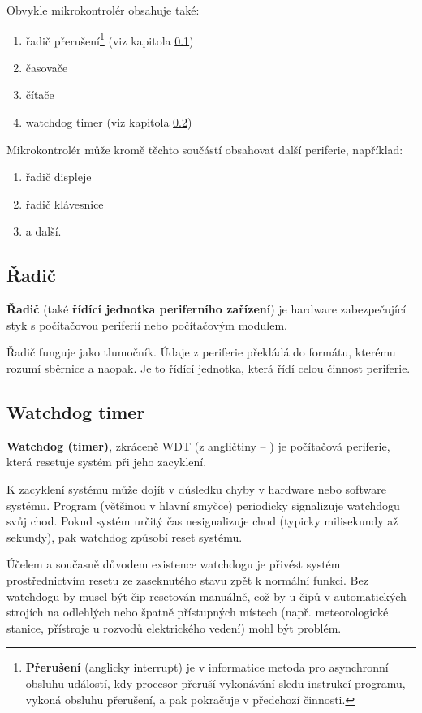 \documentclass[12pt]{article}
\begin{document}
Obvykle mikrokontrolér obsahuje také:
\begin{enumerate}
	\item řadič přerušení\footnote{\textbf{Přerušení} (anglicky interrupt) je v informatice metoda pro asynchronní obsluhu událostí, kdy procesor přeruší vykonávání sledu instrukcí programu, vykoná obsluhu přerušení, a pak pokračuje v předchozí činnosti.} 
	(viz kapitola \ref{radic})
	\item časovače 
	\item čítače
	\item watchdog timer (viz kapitola \ref{wdt})
\end{enumerate}

Mikrokontrolér může kromě těchto součástí obsahovat další periferie, například:
\begin{enumerate}
	\item řadič displeje
	\item řadič klávesnice
	\item a další.
\end{enumerate}

\subsection{Řadič} \label{radic}

\textbf{Řadič} (také \textbf{řídící jednotka periferního zařízení}) je hardware zabezpečující styk s počítačovou periferií nebo počítačovým modulem. 

Řadič funguje jako tlumočník. Údaje z periferie překládá do formátu, kterému rozumí sběrnice a naopak. Je to řídící jednotka, která řídí celou činnost periferie. 

\subsection{Watchdog timer} \label{wdt}

\textbf{Watchdog (timer)}, zkráceně WDT (z angličtiny -- ) je počíta\-čo\-vá periferie, která resetuje systém při jeho zacyklení. 

K zacyklení systému může dojít v důsledku chyby v hardware nebo software systému. Program (většinou v hlavní smyčce) periodicky signalizuje watchdogu svůj chod. Pokud systém určitý čas nesignalizuje chod (typicky milisekundy až sekundy), pak watchdog způsobí reset systému. 

Účelem a současně důvodem existence watchdogu je přivést systém prost\-řed\-nic\-tvím resetu ze zaseknutého stavu zpět k normální funkci. Bez watchdogu by musel být čip resetován manuálně, což by u čipů v automatických strojích na odlehlých nebo špatně přístupných místech (např. meteorologické stanice, přístroje u rozvodů elektrického vedení) mohl být problém.
\end{document}
